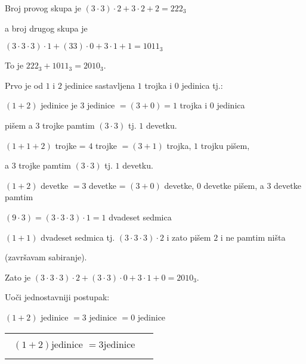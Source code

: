 \begin{zad}
        Broj provog skupa je $(3 \cdot 3) \cdot 2 + 3 \cdot 2 + 2 = 222_3$

        a broj drugog skupa je

        $(3 \cdot 3 \cdot 3) \cdot 1 + (33) \cdot 0 + 3 \cdot 1 + 1 = 1011_3$

        

        To je $222_3 + 1011_3 = 2010_3$.



        Prvo je od $1$ i $2$ jedinice sastavljena  $1$ trojka i $0$ jedinica tj.:

        

        $(1 + 2)$ jedinice je $3$ jedinice $= (3 + 0) = 1$ trojka i $0$ jedinica

        pi\v sem a $3$ trojke pamtim $(3 \cdot 3)$ tj. $1$ devetku.



        $(1 + 1 + 2)$ trojke = $4$ trojke $= (3 + 1)$ trojka, $1$ trojku pi\v sem,

        a $3$ trojke pamtim $(3 \cdot 3)$ tj. $1$ devetku.



        $(1 + 2)$ devetke $= 3$ devetke = $(3 + 0)$ devetke, $0$ devetke pi\v sem, a $3$ devetke pamtim

        $(9 \cdot 3) = (3 \cdot 3 \cdot 3) \cdot 1 = 1$ dvadeset sedmica



        $(1 + 1)$ dvadeset sedmica tj. $(3 \cdot 3 \cdot 3) \cdot 2$ i zato pi\v sem $2$ i ne pamtim ni\v sta

        (zavr\v savam sabiranje).



        Zato je $(3 \cdot 3 \cdot 3) \cdot 2 + (3 \cdot 3) \cdot 0 + 3 \cdot 1 + 0 = 2010_3$.



        Uo\v ci jednostavniji postupak:

        $(1 + 2)$ jedinice $= 3$ jedinice $= 0$ jedinice 

        \begin{center}

            \begin{tabular}{ p{1cm} p{1cm} }

                {\begin{align*}

                    \\

                    (1 + 2) \text{jedinice } = 3 \text{jedinice} \\ 


\end{align*}}
\end{tabular}
\end{center}
\end{zad}
